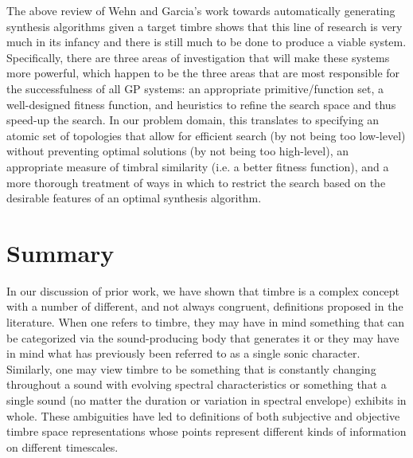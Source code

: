 \documentclass[12pt]{report} 	%
\numberwithin{figure}{chapter}
\numberwithin{table}{chapter}
\numberwithin{equation}{chapter}
\begin{document}
\begin{flushleft}
The above review of Wehn and Garcia's work towards automatically generating synthesis algorithms given a target timbre shows that this line of research is very much in its infancy and there is still much to be done to produce a viable system. Specifically, there are three areas of investigation that will make these systems more powerful, which happen to be the three areas that are most responsible for the successfulness of all GP systems: an appropriate primitive/function set, a well-designed fitness function, and heuristics to refine the search space and thus speed-up the search. In our problem domain, this translates to specifying an atomic set of topologies that allow for efficient search (by not being too low-level) without preventing optimal solutions (by not being too high-level), an appropriate measure of timbral similarity (i.e. a better fitness function), and a more thorough treatment of ways in which to restrict the search based on the desirable features of an optimal synthesis algorithm.

\vspace{12pt}
\section{Summary}
In our discussion of prior work, we have shown that timbre is a complex concept with a number of different, and not always congruent, definitions proposed in the literature. When one refers to timbre, they may have in mind something that can be categorized via the sound-producing body that generates it or they may have in mind what has previously been referred to as a single sonic character. Similarly, one may view timbre to be something that is constantly changing throughout a sound with evolving spectral characteristics or something that a single sound (no matter the duration or variation in spectral envelope) exhibits in whole. These ambiguities have led to definitions of both subjective and objective timbre space representations whose points represent different kinds of information on different timescales.


\end{flushleft}
\end{document}

